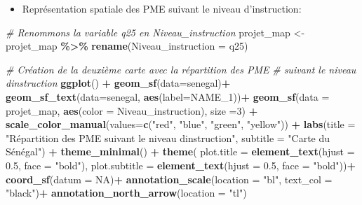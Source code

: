 \documentclass[
]{article}
\newenvironment{Shaded}{\begin{snugshade}}{\end{snugshade}}
\newcommand{\AttributeTok}[1]{\textcolor[rgb]{0.13,0.29,0.53}{#1}}
\newcommand{\CommentTok}[1]{\textcolor[rgb]{0.56,0.35,0.01}{\textit{#1}}}
\newcommand{\ConstantTok}[1]{\textcolor[rgb]{0.56,0.35,0.01}{#1}}
\newcommand{\DecValTok}[1]{\textcolor[rgb]{0.00,0.00,0.81}{#1}}
\newcommand{\FloatTok}[1]{\textcolor[rgb]{0.00,0.00,0.81}{#1}}
\newcommand{\FunctionTok}[1]{\textcolor[rgb]{0.13,0.29,0.53}{\textbf{#1}}}
\newcommand{\NormalTok}[1]{#1}
\newcommand{\OtherTok}[1]{\textcolor[rgb]{0.56,0.35,0.01}{#1}}
\newcommand{\SpecialCharTok}[1]{\textcolor[rgb]{0.81,0.36,0.00}{\textbf{#1}}}
\newcommand{\StringTok}[1]{\textcolor[rgb]{0.31,0.60,0.02}{#1}}
\providecommand{\tightlist}{%
  \setlength{\itemsep}{0pt}\setlength{\parskip}{0pt}}
\begin{document}
\begin{itemize}
\tightlist
\item
  Représentation spatiale des PME suivant le niveau d'instruction:
\end{itemize}

\begin{Shaded}
\begin{Highlighting}[]
\CommentTok{\# Renommons la variable q25 en Niveau\_instruction}
\NormalTok{projet\_map }\OtherTok{\textless{}{-}}\NormalTok{ projet\_map }\SpecialCharTok{\%\textgreater{}\%} \FunctionTok{rename}\NormalTok{(}\AttributeTok{Niveau\_instruction =}\NormalTok{ q25)}

\CommentTok{\# Création de la deuxième carte avec la répartition des PME  }
\CommentTok{\# suivant le niveau d\textquotesingle{}instruction}
\FunctionTok{ggplot}\NormalTok{() }\SpecialCharTok{+}
  \FunctionTok{geom\_sf}\NormalTok{(}\AttributeTok{data=}\NormalTok{senegal)}\SpecialCharTok{+}
  \FunctionTok{geom\_sf\_text}\NormalTok{(}\AttributeTok{data=}\NormalTok{senegal, }\FunctionTok{aes}\NormalTok{(}\AttributeTok{label=}\NormalTok{NAME\_1))}\SpecialCharTok{+}
  \FunctionTok{geom\_sf}\NormalTok{(}\AttributeTok{data =}\NormalTok{ projet\_map, }\FunctionTok{aes}\NormalTok{(}\AttributeTok{color =}\NormalTok{ Niveau\_instruction), }\AttributeTok{size =}\DecValTok{3}\NormalTok{) }\SpecialCharTok{+}
  \FunctionTok{scale\_color\_manual}\NormalTok{(}\AttributeTok{values=}\FunctionTok{c}\NormalTok{(}\StringTok{"red"}\NormalTok{, }\StringTok{"blue"}\NormalTok{, }\StringTok{"green"}\NormalTok{, }\StringTok{"yellow"}\NormalTok{)) }\SpecialCharTok{+}
  \FunctionTok{labs}\NormalTok{(}\AttributeTok{title =} \StringTok{"Répartition des PME suivant le niveau d\textquotesingle{}instruction"}\NormalTok{,}
       \AttributeTok{subtitle =} \StringTok{"Carte du Sénégal"}\NormalTok{) }\SpecialCharTok{+}
  \FunctionTok{theme\_minimal}\NormalTok{() }\SpecialCharTok{+}
  \FunctionTok{theme}\NormalTok{(}
    \AttributeTok{plot.title =} \FunctionTok{element\_text}\NormalTok{(}\AttributeTok{hjust =} \FloatTok{0.5}\NormalTok{, }\AttributeTok{face =} \StringTok{"bold"}\NormalTok{),}
    \AttributeTok{plot.subtitle =} \FunctionTok{element\_text}\NormalTok{(}\AttributeTok{hjust =} \FloatTok{0.5}\NormalTok{, }\AttributeTok{face =} \StringTok{"bold"}\NormalTok{))}\SpecialCharTok{+}
  \FunctionTok{coord\_sf}\NormalTok{(}\AttributeTok{datum =} \ConstantTok{NA}\NormalTok{)}\SpecialCharTok{+}
  \FunctionTok{annotation\_scale}\NormalTok{(}\AttributeTok{location =} \StringTok{"bl"}\NormalTok{, }\AttributeTok{text\_col =} \StringTok{"black"}\NormalTok{)}\SpecialCharTok{+}
  \FunctionTok{annotation\_north\_arrow}\NormalTok{(}\AttributeTok{location =} \StringTok{"tl"}\NormalTok{)}
\end{Highlighting}
\end{Shaded}
\end{document}
